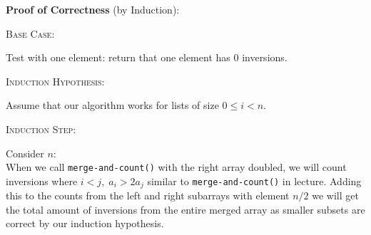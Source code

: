 \documentclass[12pt]{article}
\begin{document}
\textbf{Proof of Correctness} (by Induction):
\begin{adjustwidth}{10mm}{}
	\textsc{Base Case}:
	\begin{adjustwidth}{10mm}{}
		Test with one element: return that one element has 0 inversions.
	\end{adjustwidth}
	\textsc{Induction Hypothesis}:
	\begin{adjustwidth}{10mm}{}
		Assume that our algorithm works for lists of size $0 \leq i < n$.
	\end{adjustwidth}
	\textsc{Induction Step}:
	\begin{adjustwidth}{10mm}{}
		Consider $n$:\\
		When we call \texttt{merge-and-count()} with the right array doubled, we will count inversions where $i<j,\;a_i>2a_{j}$ similar to \texttt{merge-and-count()} in lecture.
		Adding this to the counts from the left and right subarrays with element $n/2$ we will get the total amount of inversions from the entire merged
		array as smaller subsets are correct by our induction hypothesis.\\
	\end{adjustwidth}
\end{adjustwidth}
\end{document}
